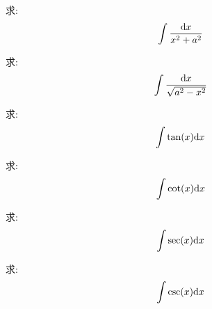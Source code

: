 \begin{example}
    求:
    \begin{equation*}
        \int \frac{\mathrm{d} x}{x^2 + a^2}
    \end{equation*}
\end{example}
\begin{solution}
    
\end{solution}

\begin{example}
    求:
    \begin{equation*}
        \int \frac{\mathrm{d} x}{\sqrt{a^2-x^2}}
    \end{equation*}
\end{example}
\begin{solution}
    
\end{solution}

\begin{example}
    求:
    \begin{equation*}
        \int \tan(x) \mathrm{d} x
    \end{equation*}
\end{example}
\begin{solution}
    
\end{solution}

\begin{example}
    求:
    \begin{equation*}
        \int \cot(x) \mathrm{d} x
    \end{equation*}
\end{example}
\begin{solution}
    
\end{solution}

\begin{example}
    求:
    \begin{equation*}
        \int \sec(x) \mathrm{d} x
    \end{equation*}
\end{example}
\begin{solution}
    
\end{solution}

\begin{example}
    求:
    \begin{equation*}
        \int \csc(x) \mathrm{d} x
    \end{equation*}
\end{example}
\begin{solution}
    
\end{solution}

